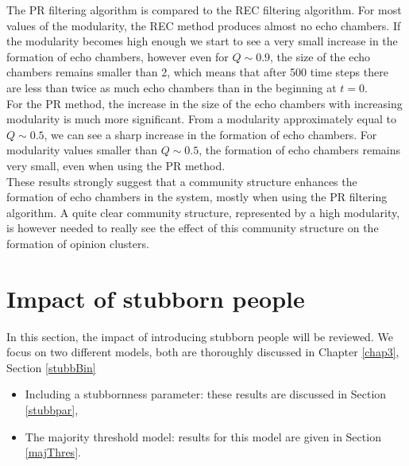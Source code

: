 \documentclass[11 pt , letterpaper , twoside , openright]{book}
\begin{document}
\newline
The PR filtering algorithm is compared to the REC filtering algorithm. For most values of the modularity, the REC method produces almost no echo chambers. If the modularity becomes high enough we start to see a very small increase in the formation of echo chambers, however even for $Q \sim 0.9$, the size of the echo chambers remains smaller than 2, which means that after 500 time steps there are less than twice as much echo chambers than in the beginning at $t=0$.\\
For the PR method, the increase in the size of the echo chambers with increasing modularity is much more significant. From a modularity approximately equal to $Q \sim 0.5$, we can see a sharp increase in the formation of echo chambers. For modularity values smaller than $Q \sim 0.5$, the formation of echo chambers remains very small, even when using the PR method.\\
These results strongly suggest that a community structure enhances the formation of echo chambers in the system, mostly when using the PR filtering algorithm. A quite clear community structure, represented by a high modularity, is however needed to really see the effect of this community structure on the formation of opinion clusters.

\newpage
\section{Impact of stubborn people}
In this section, the impact of introducing stubborn people will be reviewed. We focus on two different models, both are thoroughly discussed in Chapter \ref{chap3}, Section \ref{stubbBin}
\begin{itemize}
	\item Including a stubbornness parameter: these results are discussed in Section \ref{stubbpar},
	\item The majority threshold model: results for this model are given in Section \ref{majThres}.
\end{itemize}
\end{document}
